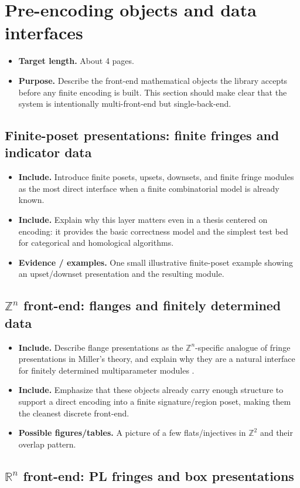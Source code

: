 \documentclass[11pt]{article}
\newenvironment{plan}{\begin{itemize}[leftmargin=1.6em,itemsep=0.35em,topsep=0.25em]}{\end{itemize}}
\newcommand{\target}[1]{\item \textbf{Target length.} #1}
\newcommand{\purpose}[1]{\item \textbf{Purpose.} #1}
\newcommand{\includeitems}[1]{\item \textbf{Include.} #1}
\newcommand{\evidence}[1]{\item \textbf{Evidence / examples.} #1}
\newcommand{\figures}[1]{\item \textbf{Possible figures/tables.} #1}
\begin{document}
\section{Pre-encoding objects and data interfaces}\label{sec:pre-encoding}

\begin{plan}
    \target{About 4 pages.}
    \purpose{Describe the front-end mathematical objects the library accepts before any finite encoding is built. This section should make clear that the system is intentionally multi-front-end but single-back-end.}
\end{plan}

\subsection{Finite-poset presentations: finite fringes and indicator data}

\begin{plan}
    \includeitems{Introduce finite posets, upsets, downsets, and finite fringe modules as the most direct interface when a finite combinatorial model is already known.}
    \includeitems{Explain why this layer matters even in a thesis centered on encoding: it provides the basic correctness model and the simplest test bed for categorical and homological algorithms.}
    \evidence{One small illustrative finite-poset example showing an upset/downset presentation and the resulting module.}
\end{plan}

\subsection{$\mathbb{Z}^n$ front-end: flanges and finitely determined data}

\begin{plan}
    \includeitems{Describe flange presentations as the $\mathbb{Z}^n$-specific analogue of fringe presentations in Miller's theory, and explain why they are a natural interface for finitely determined multiparameter modules \cite{Mil20}.}
    \includeitems{Emphasize that these objects already carry enough structure to support a direct encoding into a finite signature/region poset, making them the cleanest discrete front-end.}
    \figures{A picture of a few flats/injectives in $\mathbb{Z}^2$ and their overlap pattern.}
\end{plan}

\subsection{$\mathbb{R}^n$ front-end: PL fringes and box presentations}
\end{document}
